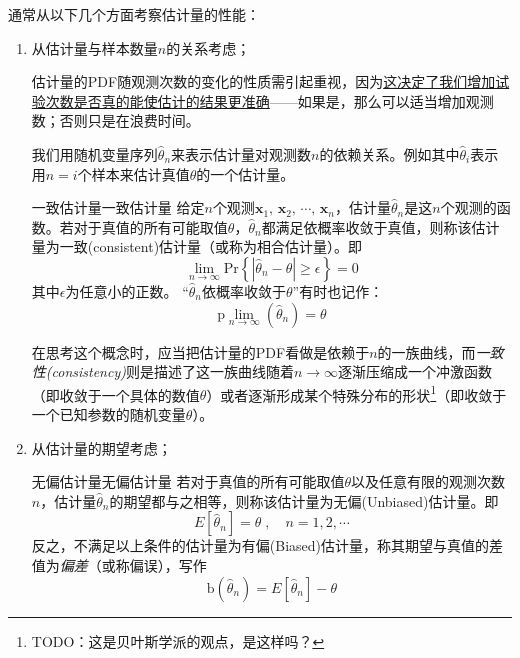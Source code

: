         通常从以下几个方面考察估计量的性能：
        \begin{enumerate}

            \item 从估计量与样本数量$n$的关系考虑；
                
                估计量的PDF随观测次数的变化的性质需引起重视，因为\uline{这决定了我们增加试验次数是否真的能使估计的结果更准确}——如果是，那么可以适当增加观测数；否则只是在浪费时间。
                
                我们用随机变量序列$\hat{\theta}_n$来表示估计量对观测数$n$的依赖关系。例如其中$\hat{\theta}_i$表示用$n=i$个样本来估计真值$\theta$的一个估计量。
                \begin{definition}{一致估计量}{一致估计量}
                    给定$n$个观测$\bm{x}_1,\,\bm{x}_2,\,\cdots,\,\bm{x}_n$，估计量$\hat{\theta}_n$是这$n$个观测的函数。若对于真值的所有可能取值$\theta$，$\hat{\theta}_n$都满足依概率收敛于真值，则称该估计量为一致(consistent)估计量（或称为相合估计量）。即
                    \begin{equation}
                        \lim_{n \to \infty}{\mathrm{Pr}\left\{|\hat{\theta}_n-\theta|\geqslant\epsilon\right\}=0}
                    \end{equation}
                    其中$\epsilon$为任意小的正数。
                    \tcblower
                    “$\hat{\theta}_n$依概率收敛于$\theta$”有时也记作：
                    \begin{equation}
                        \mathrm{p}\lim_{n \to \infty}\left(\hat{\theta}_n\right)=\theta
                    \end{equation}
                \end{definition}
                在思考这个概念时，应当把估计量的PDF看做是依赖于$n$的一族曲线，而\emph{一致性(consistency)}则是描述了这一族曲线随着$n\rightarrow\infty$逐渐压缩成一个冲激函数（即收敛于一个具体的数值$\theta$）或者逐渐形成某个特殊分布的形状\footnote[2]{TODO：这是贝叶斯学派的观点，是这样吗？}（即收敛于一个已知参数的随机变量$\theta$）。


            \item 从估计量的期望考虑；
                \begin{definition}{无偏估计量}{无偏估计量}
                    若对于真值的所有可能取值$\theta$以及任意有限的观测次数$n$，估计量$\hat{\theta}_n$的期望\footnotemark[1]都与之相等，则称该估计量为无偏(Unbiased)估计量。即
                    \begin{equation}
                        E\left[\hat{\theta}_n\right]=\theta \;,\quad n=1,2,\cdots
                    \end{equation}
                    \tcblower
                    反之，不满足以上条件的估计量为有偏(Biased)估计量，称其期望与真值的差值为\emph{偏差}（或称偏误），写作
                    \begin{equation}
                        \mathrm{b}(\hat{\theta}_n)=E\left[\hat{\theta}_n\right]-\theta
                    \end{equation}
                \end{definition}
                

\end{enumerate}
